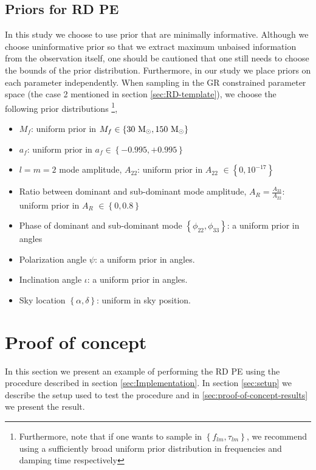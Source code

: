 \subsection{Priors for RD PE}
\label{sec:prior-gen}
In this study we choose to use prior that are minimally informative. Although we choose uninformative prior so that we extract maximum unbaised information from the observation itself, one should be cautioned that one still needs to choose the bounds of the prior distribution. Furthermore, in our study we place priors on each parameter independently. When sampling in the GR constrained parameter space (the case 2 mentioned in section \ref{sec:RD-template}), we choose the following prior distributions \footnote{Furthermore, note that if one wants to sample in $\left\lbrace f_{lm}, \tau_{lm} \right\rbrace$, we recommend using a sufficiently broad uniform prior distribution in frequencies and damping time respectively}, 
\begin{itemize}
\item $M_{f}$: uniform  prior in $M_{f} \in \left\lbrace 30 ~\mathrm{M}_\odot, 150 ~\mathrm{M}_\odot \right\rbrace $
\item $a_{f}$: uniform  prior in $a_{f} \in \left\lbrace -0.995, +0.995  \right\rbrace $
\item $l=m=2$ mode amplitude, $A_{22}$: uniform  prior in $A_{22}$ $\in \left\lbrace 0, 10^{-17}  \right\rbrace $ 
\item Ratio between dominant and sub-dominant mode amplitude, $A_{R} = \frac{A_{33}}{A_{22}}$: uniform  prior in $A_{R}$ $\in \left\lbrace 0,0.8  \right\rbrace $ 
\item Phase of dominant and sub-dominant mode $\left\lbrace \phi_{22}, \phi_{33}\right\rbrace$: a uniform prior in angles
\item Polarization angle $\psi$: a uniform prior in angles.
\item Inclination angle $\iota$: a uniform prior in angles.
\item Sky location $\left\lbrace \alpha, \delta \right\rbrace$: uniform in sky position.
\end{itemize}



\section{Proof of concept}
\label{sec:proof-of-concept}
In this section we present an example of performing the RD PE using the procedure described in section \ref{sec:Implementation}. In section \ref{sec:setup} we describe the setup used to test the procedure and in \ref{sec:proof-of-concept-results} we present the result. 

